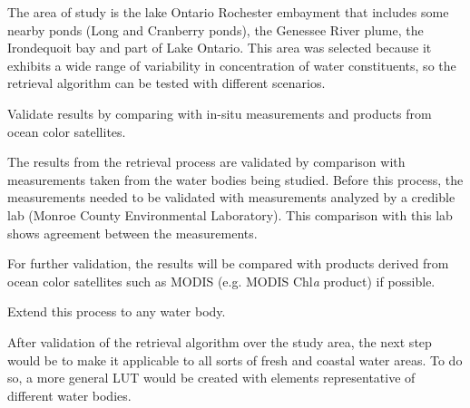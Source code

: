 \begin{enumerate}
The area of study is the lake Ontario Rochester embayment that includes some nearby ponds (Long and Cranberry ponds), the Genessee River plume, the Irondequoit bay and part of Lake Ontario. This area was selected because it exhibits a wide range of variability in concentration of water constituents, so the retrieval algorithm can be tested with different scenarios.
 
	{\bf \item Validate results by comparing with in-situ measurements and products from ocean color satellites.}

The results from the retrieval process are validated by comparison with measurements taken from the water bodies being studied. Before this process, the measurements needed to be validated with measurements analyzed by a credible lab (Monroe County Environmental Laboratory). This comparison with this lab shows agreement between the measurements. 

 For further validation, the results will be compared with products derived from ocean color satellites such as MODIS (e.g. MODIS Chl{\it a} product) if possible.

	{\bf \item {} Extend this process to any water body.}

After validation of the retrieval algorithm over the study area, the next step would be to make it applicable to all sorts of fresh and coastal water areas. To do so, a more general LUT would be created with elements representative of different water bodies.


\end{enumerate}


